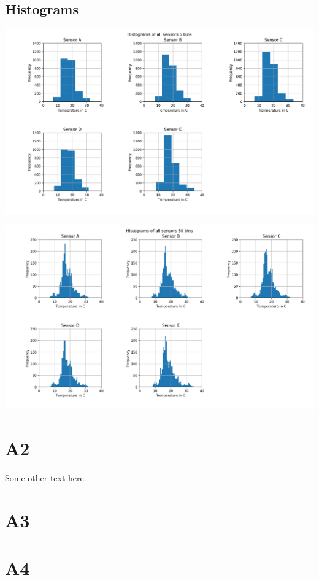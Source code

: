 \documentclass{article}
\begin{document}
    \subsection{Histograms}
        \includegraphics[width=\textwidth]{histogram_5_bins}

        \includegraphics[width=\textwidth]{histogram_50_bins}


\section{A2}

Some other text here.

\section{A3}

\section{A4}
\end{document}
